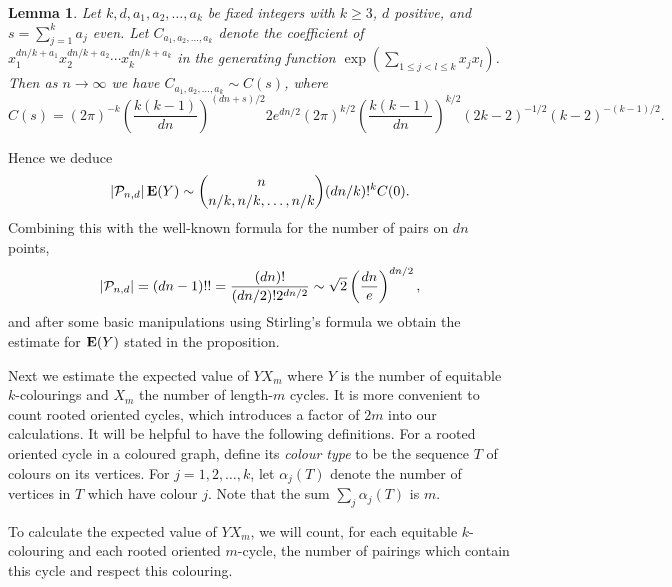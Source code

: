 \documentclass[12pt]{article}
\newcommand{\lab}[1]{\label{#1}}
\newtheorem{lemma}[thm]{Lemma}
\def\P{{\cal P}}
\def\ex{{\bf E}}
\def\Pnd{\P_{n,d}}
\def\be{\begin{equation}}
\def\ee{\end{equation}}
\newcommand{\bel}[1]{\be\lab{#1}}
\begin{document}
%
%
\begin{lemma}
\label{lem:C(s)}
Let $k, d, a_1, a_2, \ldots, a_k$ be fixed integers with $k\geq 3$, $d$ positive,
and $s = \sum_{j=1}^k a_j$ even.
Let $C_{a_1, a_2,\ldots, a_k}$ denote the coefficient of
$x_1^{dn/k+a_1} x_2^{dn/k+a_2} \cdots x_k^{dn/k+a_k}$
in the generating function
$\exp(\sum_{1 \leq j < l \leq k} x_j x_l)$. Then as $n \to \infty$ we have $C_{a_1, a_2,\ldots, a_k}\sim C(s)$, where
\[
C(s) = (2\pi)^{-k} \left(\frac{k(k-1)}{dn}\right)^{(dn + s)/2}
2 e^{dn/2} (2\pi)^{k/2} \left(\frac{k(k-1)}{dn}\right)^{k/2}
(2k-2)^{-1/2} (k-2)^{-(k-1)/2}.
\]
\end{lemma}
%
%
Hence we deduce
%
\bel{eyLong}
\left| \Pnd \right| \ex (Y) \sim
\binom{n}{n/k, n/k, \ldots, n/k} (dn/k)!^k C(0).
\ee
Combining this with the well-known formula for the number of pairs on $dn$ points,
\bel{eq:Pnd}
|\Pnd| = (dn-1)!! = \frac{(dn)!}{(dn/2)!2^{dn/2}}\sim \sqrt{2}\left(\frac{dn}{e}\right)^{dn/2},
\ee
and after some basic manipulations using Stirling's 
formula we obtain the estimate for $\ex (Y)$ stated in the proposition.

Next we estimate the expected value of $YX_m$ where $Y$ is the number of
equitable $k$-colourings and $X_m$ the number of length-$m$ cycles.
It is more convenient to count rooted oriented cycles, which 
introduces a factor
of $2m$ into our calculations.  It will be helpful to have
the following definitions. For a rooted oriented cycle in a coloured
graph, define its
\emph{colour type} to be the sequence $T$ of colours on its vertices.
For $j = 1, 2, \ldots, k$, let $\alpha_j(T)$ denote the number of 
vertices in $T$ which have colour $j$. Note that the sum $\sum_j 
\alpha_j(T)$ is $m$.

To calculate the
expected value of $YX_m$, we will count, for each equitable
$k$-colouring and each
rooted oriented $m$-cycle, the number of pairings which contain this cycle
and respect this colouring.
\end{document}
